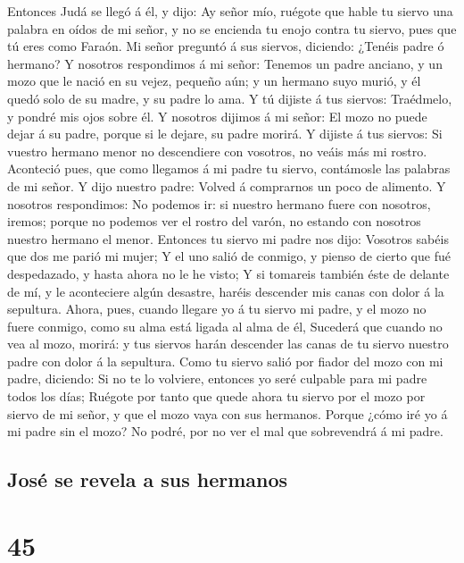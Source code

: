  Entonces Judá se llegó á él, y dijo: Ay señor mío, ruégote
que hable tu siervo una palabra en oídos de mi señor, y no se encienda
tu enojo contra tu siervo, pues que tú eres como Faraón. 
Mi señor preguntó á sus siervos, diciendo: ¿Tenéis padre ó hermano?
 Y nosotros respondimos á mi señor: Tenemos un padre
anciano, y un mozo que le nació en su vejez, pequeño aún; y un hermano
suyo murió, y él quedó solo de su madre, y su padre lo ama.
 Y tú dijiste á tus siervos: Traédmelo, y pondré mis ojos
sobre él.  Y nosotros dijimos á mi señor: El mozo no puede
dejar á su padre, porque si le dejare, su padre morirá.  Y
dijiste á tus siervos: Si vuestro hermano menor no descendiere con
vosotros, no veáis más mi rostro.  Aconteció pues, que como
llegamos á mi padre tu siervo, contámosle las palabras de mi señor.
 Y dijo nuestro padre: Volved á comprarnos un poco de
alimento.  Y nosotros respondimos: No podemos ir: si
nuestro hermano fuere con nosotros, iremos; porque no podemos ver el
rostro del varón, no estando con nosotros nuestro hermano el menor.
 Entonces tu siervo mi padre nos dijo: Vosotros sabéis que
dos me parió mi mujer;  Y el uno salió de conmigo, y pienso
de cierto que fué despedazado, y hasta ahora no le he visto;
 Y si tomareis también éste de delante de mí, y le
aconteciere algún desastre, haréis descender mis canas con dolor á la
sepultura.  Ahora, pues, cuando llegare yo á tu siervo mi
padre, y el mozo no fuere conmigo, como su alma está ligada al alma de
él,  Sucederá que cuando no vea al mozo, morirá: y tus
siervos harán descender las canas de tu siervo nuestro padre con dolor á
la sepultura.  Como tu siervo salió por fiador del mozo con
mi padre, diciendo: Si no te lo volviere, entonces yo seré culpable para
mi padre todos los días;  Ruégote por tanto que quede ahora
tu siervo por el mozo por siervo de mi señor, y que el mozo vaya con sus
hermanos.  Porque ¿cómo iré yo á mi padre sin el mozo? No
podré, por no ver el mal que sobrevendrá á mi padre.

\hypertarget{josuxe9-se-revela-a-sus-hermanos}{%
\subsection{José se revela a sus
hermanos}\label{josuxe9-se-revela-a-sus-hermanos}}

\hypertarget{section-44}{%
\section{45}\label{section-44}}

